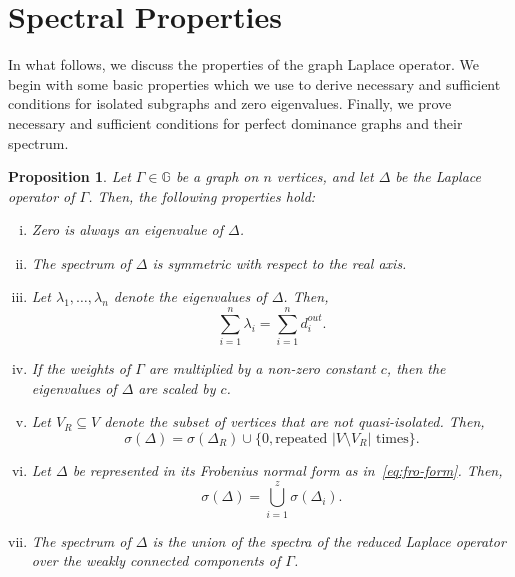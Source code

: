 \documentclass{article}
\newtheorem{proposition}[theorem]{Proposition}
\newcommand\abs[1]{\left|#1\right|}
\begin{document}
\section{Spectral Properties}
In what follows, we discuss the properties of the graph Laplace operator.
We begin with some basic properties which we use to derive necessary and sufficient conditions for isolated subgraphs and zero eigenvalues.
Finally, we prove necessary and sufficient conditions for perfect dominance graphs and their spectrum. 

\begin{proposition}\label{prop:basic}
Let $\Gamma\in\mathbb{G}$ be a graph on $n$ vertices, and let $\Delta$ be the Laplace operator of $\Gamma$.
Then, the following properties hold:
\begin{enumerate}[i.]
\item Zero is always an eigenvalue of $\Delta$. 
\item	The spectrum of $\Delta$ is symmetric with respect to the real axis.
\item	Let $\lambda_{1},\ldots,\lambda_{n}$ denote the eigenvalues of $\Delta$. Then, 
	\[
	\sum_{i=1}^{n}\lambda_{i}=\sum_{i=1}^{n}d_{i}^{out}.
	\]
\item	If the weights of $\Gamma$ are multiplied by a non-zero constant $c$, then the eigenvalues of $\Delta$ are scaled by $c$.
\item	Let $V_{R}\subseteq V$ denote the subset of vertices that are not quasi-isolated.
	Then, 
	\[
	\sigma(\Delta)=\sigma(\Delta_{R})\cup\{0, \text{repeated $\abs{V\setminus{V_{R}}}$ times}\}.
	\]
\item	Let $\Delta$ be represented in its Frobenius normal form as in~\eqref{eq:fro-form}.
	Then,
	\[
	\sigma(\Delta)=\bigcup_{i=1}^{z}\sigma(\Delta_{i}).
	\]
\item	The spectrum of $\Delta$ is the union of the spectra of the reduced Laplace operator over the weakly connected components of $\Gamma$.
\end{enumerate}
\end{proposition}
\end{document}
